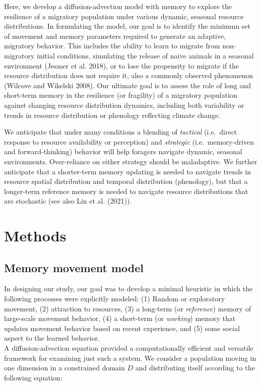 \documentclass[12pt]{article}
\begin{document}
Here, we develop a diffusion-advection model with memory to explore the
resilience of a migratory population under various dynamic, seasonal
resource distributions. In formulating the model, our goal is to
identify the minimum set of movement and memory parameters required to
generate an adaptive, migratory behavior. This includes the ability to
learn to migrate from non-migratory initial conditions, simulating the
release of naive animals in a seasonal environment (Jesmer et al. 2018),
or to lose the propensity to migrate if the resource distribution does
not require it, also a commonly observed phenomenon (Wilcove and
Wikelski 2008). Our ultimate goal is to assess the role of long and
short-term memory in the resilience (or fragility) of a migratory
population against changing resource distribution dynamics, including
both variability or trends in resource distribution or phenology
reflecting climate change.

We anticipate that under many conditions a blending of \emph{tactical}
(i.e.~direct response to resource availability or perception) and
\emph{strategic} (i.e.~memory-driven and forward-thinking) behavior will
help foragers navigate dynamic, seasonal environments. Over-reliance on
either strategy should be maladaptive. We further anticipate that a
shorter-term memory updating is needed to navigate trends in resource
spatial distribution and temporal distribution (phenology), but that a
longer-term reference memory is needed to navigate resource
distributions that are stochastic (see also Lin et al. (2021)).

\hypertarget{methods}{%
\section{Methods}\label{methods}}

\hypertarget{memory-movement-model}{%
\subsection{Memory movement model}\label{memory-movement-model}}

In designing our study, our goal was to develop a minimal heuristic in
which the following processes were explicitly modeled: (1) Random or
exploratory movement, (2) attraction to resources, (3) a long-term (or
\emph{reference}) memory of large-scale movement behavior, (4) a
short-term (or \emph{working}) memory that updates movement behavior
based on recent experience, and (5) some social aspect to the learned
behavior.\\
A diffusion-advection equation provided a computationally efficient and
versatile framework for examining just such a system. We consider a
population moving in one dimension in a constrained domain \(D\) and
distributing itself according to the following equation:
\end{document}
